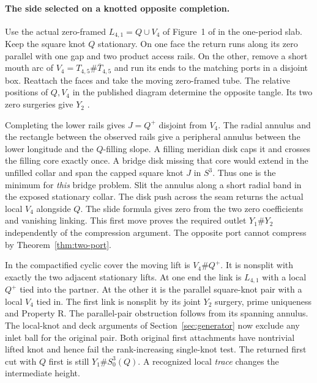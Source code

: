 \documentclass[11pt,letterpaper]{article}
\numberwithin{equation}{section}
\theoremstyle{remark}
\begin{document}
\paragraph{The side selected on a knotted opposite completion.}
Use the actual zero-framed \(L_{4,1}=Q\cup V_4\) of Figure~1 of
\cite{GompfScharlemannThompson2010} in the one-period slab.
Keep the square knot \(Q\) stationary. On one face the return runs
along its zero parallel with one gap and two product access rails.
On the other, remove a short mouth arc of
\(V_4=T_{4,5}\#\overline{T}_{4,5}\) and run its ends to the matching
ports in a disjoint box. Reattach the faces and take the moving
zero-framed tube. The relative positions of \(Q,V_4\) in the
published diagram determine the opposite tangle. Its two zero
surgeries give \(Y_2\) \cite[\S7]{GompfScharlemannThompson2010}.

Completing the lower rails gives \(J=Q^+\) disjoint from \(V_4\).
The radial annulus and the rectangle between the observed rails
give a peripheral annulus between the lower longitude and the
\(Q\)-filling slope. A filling meridian disk caps it and crosses
the filling core exactly once. A bridge disk missing that core
would extend in the unfilled collar and span the capped square
knot \(J\) in \(S^3\). Thus one is the minimum for \emph{this}
bridge problem. Slit the annulus along a short radial band in the
exposed stationary collar. The disk push across the seam returns
the actual local \(V_4\) alongside \(Q\). The slide formula gives
zero from the two zero coefficients and vanishing linking.
This first move proves the required outlet \(Y_1\#Y_2\)
independently of the compression argument. The opposite port
cannot compress by Theorem~\ref{thm:two-port}.

In the compactified cyclic cover the moving lift is
\(V_4\# Q^+\). It is nonsplit with exactly the two adjacent
stationary lifts. At one end the link is \(L_{4,1}\) with a local
\(Q^+\) tied into the partner. At the other it is the parallel
square-knot pair with a local \(V_4\) tied in. The first link is
nonsplit by its joint \(Y_2\) surgery, prime uniqueness and
Property R. The parallel-pair obstruction follows from its spanning annulus. The local-knot and
deck arguments of Section~\ref{sec:generator} now exclude any
inlet ball for the original pair. Both original first attachments
have nontrivial lifted knot and hence fail the rank-increasing
single-knot test. The returned first cut with \(Q\) first is still
\(Y_1\# S^3_0(Q)\). A recognized local \emph{trace} changes the
intermediate height.
\end{document}

